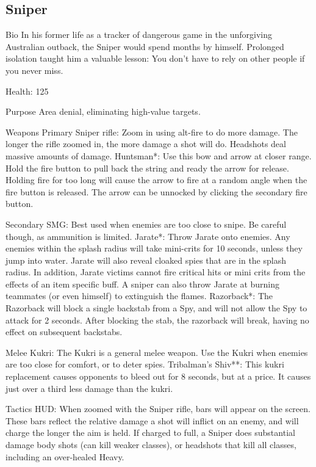 \subsection{Sniper}
Bio
In his former life as a tracker of dangerous game in the unforgiving Australian outback, the Sniper would spend months by himself. Prolonged isolation taught him a valuable lesson: You don't have to rely on other people if you never miss.

Health: 125

Purpose
Area denial, eliminating high-value targets.

Weapons
Primary
Sniper rifle: Zoom in using alt-fire to do more damage. The longer the rifle zoomed in, the more damage a shot will do. Headshots deal massive amounts of damage.
Huntsman*: Use this bow and arrow at closer range. Hold the fire button to pull back the string and ready the arrow for release. Holding fire for too long will cause the arrow to fire at a random angle when the fire button is released. The arrow can be unnocked by clicking the secondary fire button.

Secondary
SMG: Best used when enemies are too close to snipe. Be careful though, as ammunition is limited.
Jarate*: Throw Jarate onto enemies. Any enemies within the splash radius will take mini-crits for 10 seconds, unless they jump into water. Jarate will also reveal cloaked spies that are in the splash radius. In addition, Jarate victims cannot fire critical hits or mini crits from the effects of an item specific buff. A sniper can also throw Jarate at burning teammates (or even himself) to extinguish the flames. 
Razorback*: The Razorback will block a single backstab from a Spy, and will not allow the Spy to attack for 2 seconds. After blocking the stab, the razorback will break, having no effect on subsequent backstabs.

Melee
Kukri: The Kukri is a general melee weapon. Use the Kukri when enemies are too close for comfort, or to deter spies.
Tribalman's Shiv**: This kukri replacement causes opponents to bleed out for 8 seconds, but at a price. It causes just over a third less damage than the kukri.

Tactics
HUD: When zoomed with the Sniper rifle, bars will appear on the screen. These bars reflect the relative damage a shot will inflict on an enemy, and will charge the longer the aim is held. If charged to full, a Sniper does substantial damage body shots (can kill weaker classes), or headshots that kill all classes, including an over-healed Heavy.

